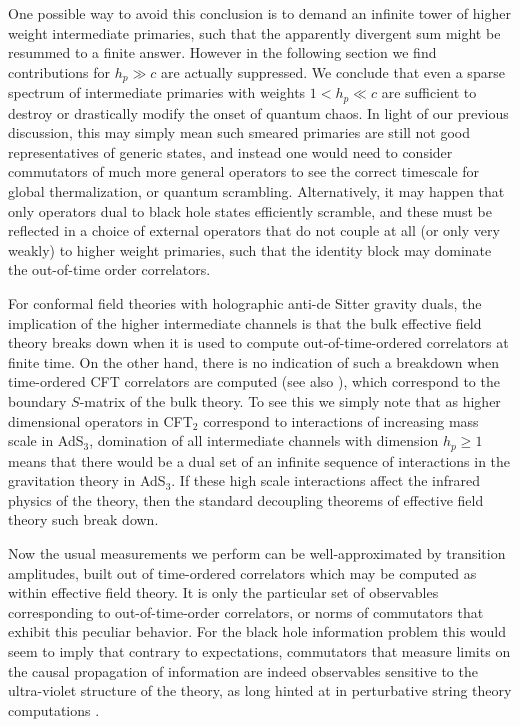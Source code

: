 \documentclass{brownthesis}
\begin{document}
One possible way to avoid this conclusion is to demand an infinite
tower of higher weight intermediate primaries, such that the apparently
divergent sum might be resummed to a finite answer. However in the
following section we find contributions for $h_{p}\gg c$ are actually
suppressed. We conclude that even a sparse spectrum of intermediate
primaries with weights $1<h_{p}\ll c$ are sufficient to destroy or
drastically modify the onset of quantum chaos. In light of our previous
discussion, this may simply mean such smeared primaries are still
not good representatives of generic states, and instead one would
need to consider commutators of much more general operators to see
the correct timescale for global thermalization, or quantum scrambling.
Alternatively, it may happen that only operators dual to black hole
states efficiently scramble, and these must be reflected in a choice
of external operators that do not couple at all (or only very weakly)
to higher weight primaries, such that the identity block may dominate
the out-of-time order correlators.

For conformal field theories with holographic anti-de Sitter gravity
duals, the implication of the higher intermediate channels is that
the bulk effective field theory breaks down when it is used to compute
out-of-time-ordered correlators at finite time. On the other hand,
there is no indication of such a breakdown when time-ordered CFT correlators
are computed (see also \cite{Fitzpatrick:2016ive,Fitzpatrick:2016mjq}),
which correspond to the boundary $S$-matrix of the bulk theory. To
see this we simply note that as higher dimensional operators in CFT$_{2}$
correspond to interactions of increasing mass scale in AdS$_{3}$,
domination of all intermediate channels with dimension $h_{p}\geq1$
means that there would be a dual set of an infinite sequence of interactions
in the gravitation theory in AdS$_{3}$. If these high scale interactions
affect the infrared physics of the theory, then the standard decoupling
theorems of effective field theory such \cite{PhysRevD.11.2856}
break down.

Now the usual measurements we perform can be well-approximated by
transition amplitudes, built out of time-ordered correlators which
may be computed as within effective field theory. It is only the particular
set of observables corresponding to out-of-time-order correlators,
or norms of commutators that exhibit this peculiar behavior. For the
black hole information problem this would seem to imply that contrary
to expectations, commutators that measure limits on the causal propagation
of information are indeed observables sensitive to the ultra-violet
structure of the theory, as long hinted at in perturbative string
theory computations \cite{Lowe:1995pu,Lowe:1995ac}.
\end{document}
